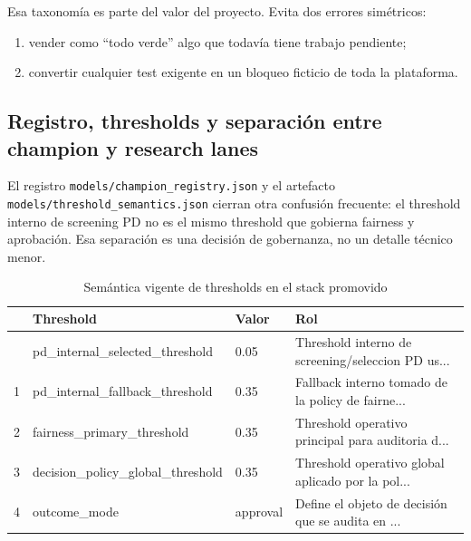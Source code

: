 \documentclass[
  spanish,
  11pt,
  letterpaper,
]{scrbook}
\providecommand{\tightlist}{%
  \setlength{\itemsep}{0pt}\setlength{\parskip}{0pt}}
\theoremstyle{plain}
\theoremstyle{remark}
\begin{document}
Esa taxonomía es parte del valor del proyecto. Evita dos errores
simétricos:

\begin{enumerate}
\def\labelenumi{\arabic{enumi}.}
\tightlist
\item
  vender como ``todo verde'' algo que todavía tiene trabajo pendiente;
\item
  convertir cualquier test exigente en un bloqueo ficticio de toda la
  plataforma.
\end{enumerate}

\subsection{Registro, thresholds y separación entre champion y research
lanes}\label{registro-thresholds-y-separaciuxf3n-entre-champion-y-research-lanes}

El registro \texttt{models/champion\_registry.json} y el artefacto
\texttt{models/threshold\_semantics.json} cierran otra confusión
frecuente: el threshold interno de screening PD no es el mismo threshold
que gobierna fairness y aprobación. Esa separación es una decisión de
gobernanza, no un detalle técnico menor.

{

\begin{longtable}[]{@{}llll@{}}

\caption{\label{tbl-mrm-threshold-semantics-current}Semántica vigente de
thresholds en el stack promovido}

\tabularnewline

\toprule\noalign{}
& Threshold & Valor & Rol \\
\midrule\noalign{}
\endhead
\bottomrule\noalign{}
\endlastfoot
0 & pd\_internal\_selected\_threshold & 0.05 & Threshold interno de
screening/seleccion PD us... \\
1 & pd\_internal\_fallback\_threshold & 0.35 & Fallback interno tomado
de la policy de fairne... \\
2 & fairness\_primary\_threshold & 0.35 & Threshold operativo principal
para auditoria d... \\
3 & decision\_policy\_global\_threshold & 0.35 & Threshold operativo
global aplicado por la pol... \\
4 & outcome\_mode & approval & Define el objeto de decisión que se
audita en ... \\

\end{longtable}

}
\end{document}
